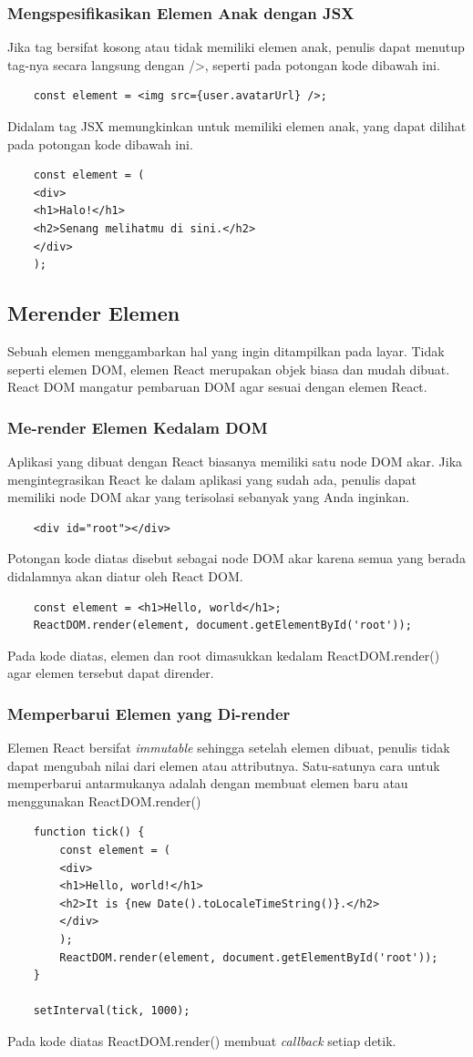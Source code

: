 \subsubsection{Mengspesifikasikan Elemen Anak dengan JSX}
Jika tag bersifat kosong atau tidak memiliki elemen anak, penulis dapat menutup tag-nya secara langsung dengan />, seperti pada potongan kode dibawah ini.
\begin{lstlisting}
	const element = <img src={user.avatarUrl} />;
\end{lstlisting}
Didalam tag JSX memungkinkan untuk memiliki elemen anak, yang dapat dilihat pada potongan kode dibawah ini.
\begin{lstlisting}
	const element = (
	<div>
	<h1>Halo!</h1>
	<h2>Senang melihatmu di sini.</h2>
	</div>
	);
\end{lstlisting}

\subsection{Merender Elemen}
Sebuah elemen menggambarkan hal yang ingin ditampilkan pada layar. Tidak seperti elemen DOM, elemen React merupakan objek biasa dan mudah dibuat. React DOM mangatur pembaruan DOM agar sesuai dengan elemen React.
\subsubsection{Me-render Elemen Kedalam DOM}
Aplikasi yang dibuat dengan React biasanya memiliki satu node DOM akar. Jika mengintegrasikan React ke dalam aplikasi yang sudah ada, penulis dapat memiliki node DOM akar yang terisolasi sebanyak yang Anda inginkan.
\begin{lstlisting}
	<div id="root"></div>
\end{lstlisting}
Potongan kode diatas disebut sebagai node DOM akar karena semua yang berada didalamnya akan diatur oleh React DOM.
\begin{lstlisting}
	const element = <h1>Hello, world</h1>;
	ReactDOM.render(element, document.getElementById('root'));
\end{lstlisting}
Pada kode diatas, elemen dan root dimasukkan kedalam ReactDOM.render() agar elemen tersebut dapat dirender.
\subsubsection{Memperbarui Elemen yang Di-render}
Elemen React bersifat \textit{immutable} sehingga setelah elemen dibuat, penulis tidak dapat mengubah nilai dari elemen atau attributnya. Satu-satunya cara untuk memperbarui antarmukanya adalah dengan membuat elemen baru atau menggunakan ReactDOM.render()
\begin{lstlisting}
	function tick() {
		const element = (
		<div>
		<h1>Hello, world!</h1>
		<h2>It is {new Date().toLocaleTimeString()}.</h2>
		</div>
		);
		ReactDOM.render(element, document.getElementById('root'));
	}
	
	setInterval(tick, 1000);
\end{lstlisting}
Pada kode diatas ReactDOM.render() membuat \textit{callback} setiap detik.

